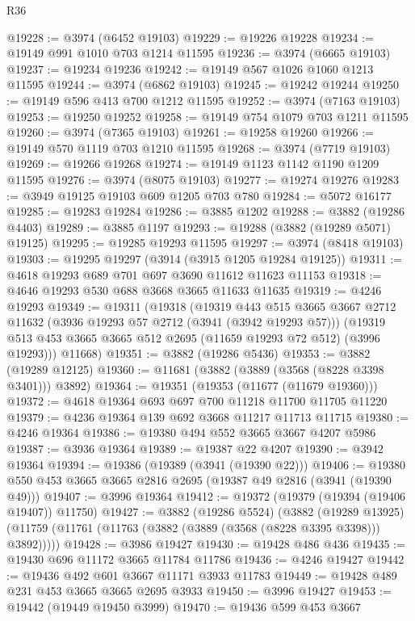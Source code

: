 \begin{lexlean}{R36}
\begin{coremodule}
@19228 := @3974 (@6452 @19103)
@19229 := @19226 @19228
@19234 := @19149 @991 @1010 @703 @1214 @11595
@19236 := @3974 (@6665 @19103)
@19237 := @19234 @19236
@19242 := @19149 @567 @1026 @1060 @1213 @11595
@19244 := @3974 (@6862 @19103)
@19245 := @19242 @19244
@19250 := @19149 @596 @413 @700 @1212 @11595
@19252 := @3974 (@7163 @19103)
@19253 := @19250 @19252
@19258 := @19149 @754 @1079 @703 @1211 @11595
@19260 := @3974 (@7365 @19103)
@19261 := @19258 @19260
@19266 := @19149 @570 @1119 @703 @1210 @11595
@19268 := @3974 (@7719 @19103)
@19269 := @19266 @19268
@19274 := @19149 @1123 @1142 @1190 @1209 @11595
@19276 := @3974 (@8075 @19103)
@19277 := @19274 @19276
@19283 := @3949 @19125 @19103 @609 @1205 @703 @780
@19284 := @5072 @16177
@19285 := @19283 @19284
@19286 := @3885 @1202
@19288 := @3882 (@19286 @4403)
@19289 := @3885 @1197
@19293 := @19288 (@3882 (@19289 @5071) @19125)
@19295 := @19285 @19293 @11595
@19297 := @3974 (@8418 @19103)
@19303 := @19295 @19297 (@3914 (@3915 @1205 @19284 @19125))
@19311 := @4618 @19293 @689 @701 @697 @3690 @11612 @11623 @11153
@19318 := @4646 @19293 @530 @688 @3668 @3665 @11633 @11635
@19319 := @4246 @19293
@19349 := @19311
    (@19318
      (@19319
        @443
        @515
        @3665
        @3667
        @2712
        @11632
        (@3936 @19293 @57 @2712 (@3941 (@3942 @19293 @57)))
        (@19319 @513 @453 @3665 @3665 @512 @2695 (@11659 @19293 @72 @512) (@3996 @19293)))
      @11668)
@19351 := @3882 (@19286 @5436)
@19353 := @3882 (@19289 @12125)
@19360 := @11681 (@3882 (@3889 (@3568 (@8228 @3398 @3401))) @3892)
@19364 := @19351 (@19353 (@11677 (@11679 @19360)))
@19372 := @4618 @19364 @693 @697 @700 @11218 @11700 @11705 @11220
@19379 := @4236 @19364 @139 @692 @3668 @11217 @11713 @11715
@19380 := @4246 @19364
@19386 := @19380 @494 @552 @3665 @3667 @4207 @5986
@19387 := @3936 @19364
@19389 := @19387 @22 @4207
@19390 := @3942 @19364
@19394 := @19386 (@19389 (@3941 (@19390 @22)))
@19406 := @19380 @550 @453 @3665 @3665 @2816 @2695 (@19387 @49 @2816 (@3941 (@19390 @49)))
@19407 := @3996 @19364
@19412 := @19372 (@19379 (@19394 (@19406 @19407)) @11750)
@19427 := @3882
    (@19286 @5524)
    (@3882
      (@19289 @13925)
      (@11759 (@11761 (@11763 (@3882 (@3889 (@3568 (@8228 @3395 @3398))) @3892)))))
@19428 := @3986 @19427
@19430 := @19428 @486 @436
@19435 := @19430 @696 @11172 @3665 @11784 @11786
@19436 := @4246 @19427
@19442 := @19436 @492 @601 @3667 @11171 @3933 @11783
@19449 := @19428 @489 @231 @453 @3665 @3665 @2695 @3933
@19450 := @3996 @19427
@19453 := @19442 (@19449 @19450 @3999)
@19470 := @19436
    @599
    @453
    @3667

\end{coremodule}
\end{lexlean}
